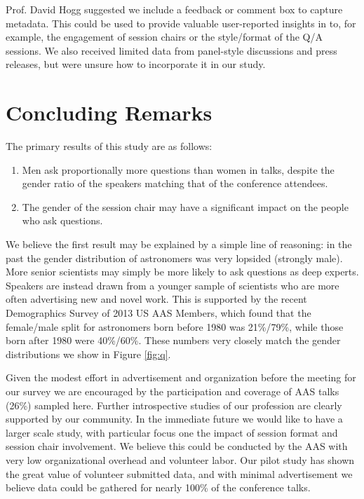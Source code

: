 \documentclass[iop]{emulateapj}
\begin{document}
Prof. David Hogg suggested we include a feedback or comment box to capture metadata. This could be used to provide valuable user-reported insights in to, for example, the engagement of session chairs or the style/format of the Q/A sessions. 
We also received limited data from panel-style discussions and press releases, but were unsure how to incorporate it in our study. 






\section{Concluding Remarks}

The primary results of this study are as follows:
\begin{enumerate}
\item Men ask proportionally more questions than women in talks, despite the gender ratio of the speakers matching that of the conference attendees.
\item The gender of the session chair may have a significant impact on the people who ask questions.
\end{enumerate}

We believe the first result may be explained by a simple line of reasoning: in the past the gender distribution of astronomers was very lopsided (strongly male). More senior scientists may simply be more likely to ask questions as deep experts. Speakers are instead drawn from a younger sample of scientists who are more often advertising new and novel work. This is supported by the recent Demographics Survey of 2013 US AAS Members, which found that the female/male split for astronomers born before 1980 was 21\%/79\%, while those born after 1980 were 40\%/60\%. These numbers very closely match the gender distributions we show in Figure \ref{fig:q}.

Given the modest effort in advertisement and organization before the meeting for our survey we are encouraged by the participation and coverage of AAS talks (26\%) sampled here. Further introspective studies of our profession are clearly supported by our community. In the immediate future we would like to have a larger scale study, with particular focus one the impact of session format and session chair involvement. We believe this could be conducted by the AAS with very low organizational overhead and volunteer labor. Our pilot study has shown the great value of volunteer submitted data, and with minimal advertisement we believe data could be gathered for nearly 100\% of the conference talks.
\end{document}
